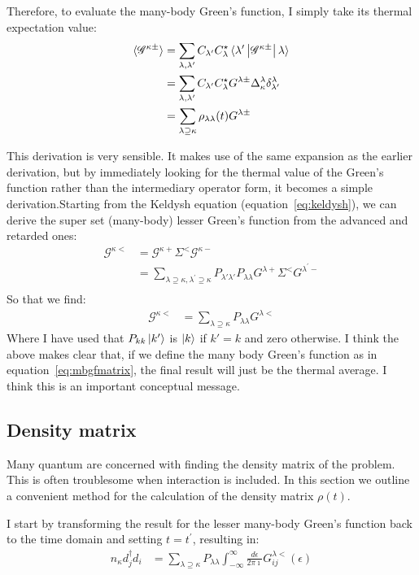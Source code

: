 Therefore, to evaluate the many-body Green's function, I simply take its thermal expectation value:
\begin{align*}
\braket{ \mathscr{G}^{\kappa\pm}} &= \sum_{\lambda,\lambda^\prime}C_{\lambda^\prime}C_\lambda^\star \braket{\lambda^\prime \left| \mathscr{G}^{\kappa\pm} \right| \lambda } \\
&= \sum_{\lambda,\lambda^\prime} C_{\lambda^\prime}C_\lambda^\star  G^{\lambda\pm} \Delta^\lambda_\kappa \delta^\lambda_{\lambda^\prime}\\
&= \sum_{\lambda \supseteq \kappa} \rho_{\lambda\lambda}(t) G^{\lambda\pm} 
\end{align*}

This derivation is very sensible. It makes use of the same expansion as the earlier derivation, but by immediately looking for the thermal value of the Green's function rather than the intermediary operator form, it becomes a simple derivation.Starting from the Keldysh equation (equation~\ref{eq:keldysh}), we can derive the super set (many-body) lesser Green's function from the advanced and retarded ones:
\begin{align*}
    \mathscr{G}^{\kappa<} &= \mathscr{G}^{\kappa+} \Sigma^< \mathscr{G}^{\kappa-} \\
    &= \sum_{\lambda\supseteq\kappa, \lambda^\prime \supseteq\kappa}P_{\lambda'\lambda'} P_{\lambda\lambda} G^{\lambda+} \Sigma^< G^{\lambda^\prime-} \\
\end{align*}
So that we find:
\begin{align}
    \mathscr{G}^{\kappa<} &= \sum_{\lambda\supseteq\kappa} P_{\lambda\lambda} G^{\lambda<} \label{eq:mblessergf}
\end{align}
Where I have used that $P_{kk} \ket{k'}$ is $\ket{k}$ if $k'=k$ and zero otherwise. I think the above makes clear that, if we define the many body Green's function as in equation~\ref{eq:mbgfmatrix}, the final result will just be the thermal average. I think this is an important conceptual message.

\subsection{Density matrix}
Many quantum are concerned with finding the density matrix of the problem. This is often troublesome when interaction is included. In this section we outline a convenient method for the calculation of the density matrix $\rho(t)$.

I start by transforming the result for the lesser many-body Green's function back to the time domain and setting $t=t^\prime$, resulting in:
\begin{align*}
n_\kappa d_j^\dagger d_i &= \sum_{\lambda\supseteq\kappa} P_{\lambda\lambda} \int^\infty_{-\infty} \frac{d\epsilon}{2\pi\imath} G^{\lambda<}_{ij}(\epsilon)
\end{align*}

